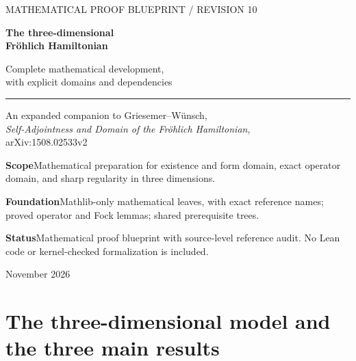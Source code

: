 \documentclass[11pt,a4paper]{article}
\theoremstyle{definition}
\theoremstyle{remark}
\begin{document}
\hypersetup{pageanchor=false}
\begin{titlepage}
\thispagestyle{empty}
\setlength{\parindent}{0pt}
\vspace*{13mm}
{\sffamily\color{inkblue}\large MATHEMATICAL PROOF BLUEPRINT / REVISION 10}\par
\vspace{12mm}
{\sffamily\bfseries\Huge The three-dimensional\\[2mm] Fr\"ohlich Hamiltonian}\par
\vspace{6mm}
{\sffamily\LARGE Complete mathematical development,\\[3mm]
with explicit domains and dependencies}\par
\vspace{15mm}
\noindent\rule{\textwidth}{0.7pt}\par
\vspace{6mm}
{\large An expanded companion to Griesemer--W\"unsch,\\
\emph{Self-Adjointness and Domain of the Fr\"ohlich Hamiltonian},\\
arXiv:1508.02533v2}\par
\vspace{12mm}
\noindent\textbf{Scope}\quad Mathematical preparation for existence and form domain,
exact operator domain, and sharp regularity in three dimensions.\par
\vspace{4mm}
\noindent\textbf{Foundation}\quad Mathlib-only mathematical leaves, with exact reference names;
proved operator and Fock lemmas; shared prerequisite trees.\par
\vspace{4mm}
\noindent\textbf{Status}\quad Mathematical proof blueprint with source-level reference audit.
No Lean code or kernel-checked formalization is included.\par
\vfill
{ November 2026}\par
\end{titlepage}
\hypersetup{pageanchor=true}
\begingroup
\small
\setlength{\parskip}{0pt}
\tableofcontents
\endgroup
\clearpage
{}

\section{The three-dimensional model and the three main results}
\label{sec:targets}
\end{document}

